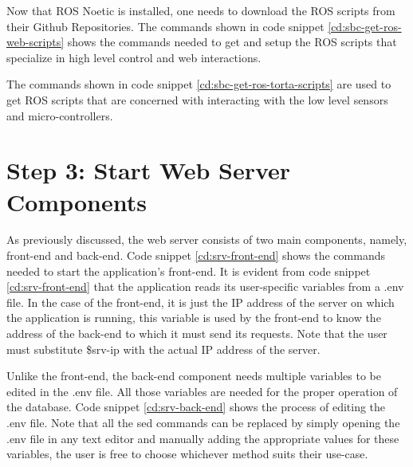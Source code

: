 Now that ROS Noetic is installed, one needs to download the ROS scripts from their Github Repositories. The commands shown in code snippet \ref{cd:sbc-get-ros-web-scripts} shows the commands needed to get and setup the ROS scripts that specialize in high level control and web interactions.


The commands shown in code snippet \ref{cd:sbc-get-ros-torta-scripts} are used to get ROS scripts that are concerned with interacting with the low level sensors and micro-controllers.

\newpage
\section{Step 3: Start Web Server Components}
As previously discussed, the web server consists of two main components, namely, front-end and back-end. Code snippet \ref{cd:srv-front-end} shows the commands needed to start the application's front-end. It is evident from code snippet \ref{cd:srv-front-end} that the application reads its user-specific variables from a .env file. In the case of the front-end, it is just the IP address of the server on which the application is running, this variable is used by the front-end to know the address of the back-end to which it must send its requests. Note that the user must substitute \$srv-ip with the actual IP address of the server.



Unlike the front-end, the back-end component needs multiple variables to be edited in the .env file. All those variables are needed for the proper operation of the database. Code snippet \ref{cd:srv-back-end} shows the process of editing the .env file. Note that all the sed commands can be replaced by simply opening the .env file in any text editor and manually adding the appropriate values for these variables, the user is free to choose whichever method suits their use-case.


